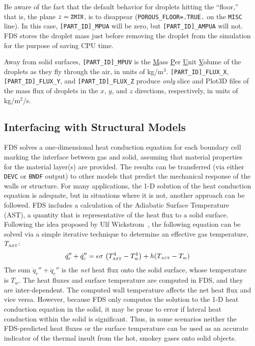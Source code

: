 \documentclass[11pt]{book}
\newcommand{\ct}{\tt\small}
\newcommand{\be}{\begin{equation}}
\newcommand{\ee}{\end{equation}}
\begin{document}
Be aware of the fact that the default behavior for droplets hitting the ``floor,'' that is, the plane $z=\hbox{\ct ZMIN}$, is to disappear ({\ct POROUS\_FLOOR=.TRUE.} on the
{\ct MISC} line). 
In this case, {\ct [PART\_ID]\_MPUA} will be zero, but {\ct [PART\_ID]\_AMPUA} will not. FDS stores the droplet mass just before removing the droplet from
the simulation for the purpose of saving CPU time.

Away from solid surfaces, {\ct [PART\_ID]\_MPUV} is the \underline{M}ass \underline{P}er \underline{U}nit \underline{V}olume of the droplets as they fly through
the air, in units of kg/m$^3$.  {\ct [PART\_ID]\_FLUX\_X},  {\ct [PART\_ID]\_FLUX\_Y}, and {\ct [PART\_ID]\_FLUX\_Z} produce {\em only} slice and Plot3D files
of the mass flux of droplets in the $x$, $y$, and $z$ directions, respectively, in units of kg/m$^2$/s.




\subsection{Interfacing with Structural Models}
\label{info:AST} 

FDS solves a one-dimensional heat conduction equation for each boundary cell marking the interface
between gas and solid, assuming that material properties for the material layer(s) are provided. The results can
be transferred (via either {\ct DEVC} or {\ct BNDF} output) to other models that predict the
mechanical response of the walls or structure. For many applications, the 1-D solution of the heat conduction
equation is adequate, but in situations where it is not, another approach can be followed. FDS includes a
calculation of the Adiabatic Surface Temperature (AST), a quantity that is representative of the heat flux to a
solid surface. Following the idea proposed by Ulf Wickstrom~\cite{SFPE:Wickstrom}, the following equation can
be solved via a simple iterative technique to determine an effective gas temperature, $T_{\hbox{\tiny AST}}$:
\be \dot{q}_r'' + \dot{q}_c'' = \epsilon \sigma \, \left( T_{\hbox{\tiny AST}}^4 - T_w^4 \right) + h (T_{\hbox{\tiny AST}} - T_w )  \ee
The sum $\dot{q}_r'' + \dot{q}_c''$ is the {\em net} heat flux onto the solid surface, whose temperature is
$T_w$. The heat fluxes and surface temperature are computed in FDS, and they are inter-dependent. The computed wall
temperature affects the net heat flux and vice versa. However, because FDS only computes the solution to the
1-D heat conduction equation in the solid, it may be prone to error if lateral heat conduction within the solid is
significant. Thus, in some scenarios neither the FDS-predicted heat fluxes or the surface temperature can be used as
an accurate indicator of the thermal insult from the hot, smokey gases onto solid objects.
\end{document}
